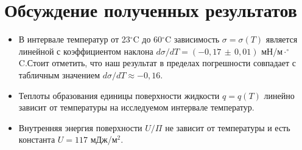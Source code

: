 \documentclass[a4paper,12pt]{article} %
\begin{document}
\newpage
\section*{Обсуждение полученных результатов}
\begin{itemize}
	\item 
		В интервале температур от 23$^\circ$C до 60$^\circ$C зависимость $\sigma = \sigma(T)$ является линейной с коэффициентом наклона $d\sigma / dT = (-0,17\,\pm\, 0,01)$  мН/м$\cdot^\circ$C.Стоит отметить, что наш результат в пределах погрешности совпадает с табличным значением $d\sigma / dT \approx -0,16$.
	\item 
		Теплоты образования единицы поверхности жидкости $q = q(T)$ линейно зависит от температуры на исследуемом интервале температур.
	\item 	
		Внутренняя энергия поверхности $U/\Pi$ не зависит от температуры и есть константа $U = 117$ мДж/м$^2$.
\end{itemize}	
\end{document}
